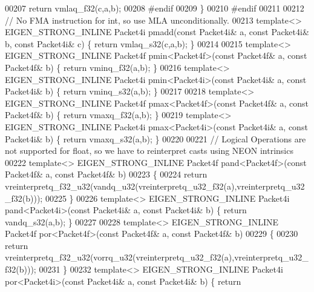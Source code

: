\begin{DoxyCode}
{{00207   \textcolor{keywordflow}{return} vmlaq\_f32(c,a,b);
00208 \textcolor{preprocessor}{#endif}
00209 \}
00210 \textcolor{preprocessor}{#endif}
00211 
00212 \textcolor{comment}{// No FMA instruction for int, so use MLA unconditionally.}
00213 \textcolor{keyword}{template}<> EIGEN\_STRONG\_INLINE Packet4i pmadd(\textcolor{keyword}{const} Packet4i& a, \textcolor{keyword}{const} Packet4i& b, \textcolor{keyword}{const} Packet4i& c) \{ \textcolor{keywordflow}{
      return} vmlaq\_s32(c,a,b); \}
00214 
00215 \textcolor{keyword}{template}<> EIGEN\_STRONG\_INLINE Packet4f pmin<Packet4f>(\textcolor{keyword}{const} Packet4f& a, \textcolor{keyword}{const} Packet4f& b) \{ \textcolor{keywordflow}{return} 
      vminq\_f32(a,b); \}
00216 \textcolor{keyword}{template}<> EIGEN\_STRONG\_INLINE Packet4i pmin<Packet4i>(\textcolor{keyword}{const} Packet4i& a, \textcolor{keyword}{const} Packet4i& b) \{ \textcolor{keywordflow}{return} 
      vminq\_s32(a,b); \}
00217 
00218 \textcolor{keyword}{template}<> EIGEN\_STRONG\_INLINE Packet4f pmax<Packet4f>(\textcolor{keyword}{const} Packet4f& a, \textcolor{keyword}{const} Packet4f& b) \{ \textcolor{keywordflow}{return} 
      vmaxq\_f32(a,b); \}
00219 \textcolor{keyword}{template}<> EIGEN\_STRONG\_INLINE Packet4i pmax<Packet4i>(\textcolor{keyword}{const} Packet4i& a, \textcolor{keyword}{const} Packet4i& b) \{ \textcolor{keywordflow}{return} 
      vmaxq\_s32(a,b); \}
00220 
00221 \textcolor{comment}{// Logical Operations are not supported for float, so we have to reinterpret casts using NEON intrinsics}
00222 \textcolor{keyword}{template}<> EIGEN\_STRONG\_INLINE Packet4f pand<Packet4f>(\textcolor{keyword}{const} Packet4f& a, \textcolor{keyword}{const} Packet4f& b)
00223 \{
00224   \textcolor{keywordflow}{return} vreinterpretq\_f32\_u32(vandq\_u32(vreinterpretq\_u32\_f32(a),vreinterpretq\_u32\_f32(b)));
00225 \}
00226 \textcolor{keyword}{template}<> EIGEN\_STRONG\_INLINE Packet4i pand<Packet4i>(\textcolor{keyword}{const} Packet4i& a, \textcolor{keyword}{const} Packet4i& b) \{ \textcolor{keywordflow}{return} 
      vandq\_s32(a,b); \}
00227 
00228 \textcolor{keyword}{template}<> EIGEN\_STRONG\_INLINE Packet4f por<Packet4f>(\textcolor{keyword}{const} Packet4f& a, \textcolor{keyword}{const} Packet4f& b)
00229 \{
00230   \textcolor{keywordflow}{return} vreinterpretq\_f32\_u32(vorrq\_u32(vreinterpretq\_u32\_f32(a),vreinterpretq\_u32\_f32(b)));
00231 \}
00232 \textcolor{keyword}{template}<> EIGEN\_STRONG\_INLINE Packet4i por<Packet4i>(\textcolor{keyword}{const} Packet4i& a, \textcolor{keyword}{const} Packet4i& b) \{ \textcolor{keywordflow}{return} 
}}
\end{DoxyCode}

